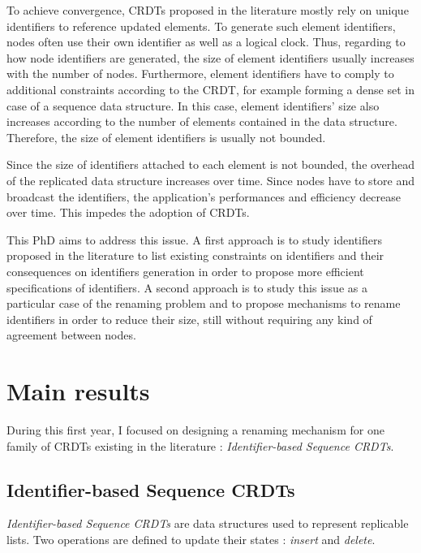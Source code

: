 \documentclass[11pt]{article}
\begin{document}
To achieve convergence, \acp{CRDT} proposed in the literature mostly rely on unique identifiers to reference updated elements.
To generate such element identifiers, nodes often use their own identifier as well as a logical clock.
Thus, regarding to how node identifiers are generated, the size of element identifiers usually increases with the number of nodes.
Furthermore, element identifiers have to comply to additional constraints according to the \ac{CRDT}, for example forming a dense set in case of a sequence data structure.
In this case, element identifiers' size also increases according to the number of elements contained in the data structure.
Therefore, the size of element identifiers is usually not bounded.

Since the size of identifiers attached to each element is not bounded, the overhead of the replicated data structure increases over time.
Since nodes have to store and broadcast the identifiers, the application's performances and efficiency decrease over time.
This impedes the adoption of \acp{CRDT}.

This PhD aims to address this issue.
A first approach is to study identifiers proposed in the literature to list existing constraints on
identifiers and their consequences on identifiers generation
in order to propose more efficient specifications of identifiers.
A second approach is to study this issue as a particular case of the renaming problem
and to propose mechanisms to rename identifiers in order to reduce their size,
still without requiring any kind of agreement between nodes.

\section*{Main results}

\hspace{1em} During this first year, I focused on designing a renaming mechanism for one family of \acp{CRDT} existing in the literature : \emph{Identifier-based Sequence \acp{CRDT}}.

\subsection*{Identifier-based Sequence \acp{CRDT}}

\hspace{1em} \emph{Identifier-based Sequence \acp{CRDT}} are data structures used to represent replicable lists.
Two operations are defined to update their states : \emph{insert} and \emph{delete}.
\end{document}
